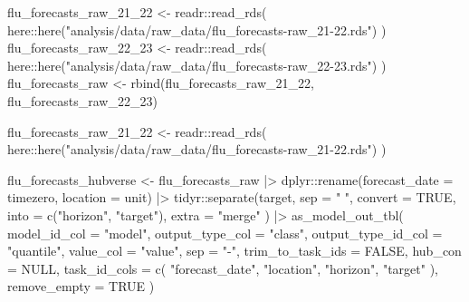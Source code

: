 \documentclass[
]{article}
\newenvironment{Shaded}{\begin{snugshade}}{\end{snugshade}}
\newcommand{\AttributeTok}[1]{\textcolor[rgb]{0.40,0.45,0.13}{#1}}
\newcommand{\ConstantTok}[1]{\textcolor[rgb]{0.56,0.35,0.01}{#1}}
\newcommand{\FunctionTok}[1]{\textcolor[rgb]{0.28,0.35,0.67}{#1}}
\newcommand{\NormalTok}[1]{\textcolor[rgb]{0.00,0.23,0.31}{#1}}
\newcommand{\OtherTok}[1]{\textcolor[rgb]{0.00,0.23,0.31}{#1}}
\newcommand{\SpecialCharTok}[1]{\textcolor[rgb]{0.37,0.37,0.37}{#1}}
\newcommand{\StringTok}[1]{\textcolor[rgb]{0.13,0.47,0.30}{#1}}
\begin{document}
\begin{Shaded}
\begin{Highlighting}[]
\NormalTok{flu\_forecasts\_raw\_21\_22 }\OtherTok{\textless{}{-}}\NormalTok{ readr}\SpecialCharTok{::}\FunctionTok{read\_rds}\NormalTok{(}
\NormalTok{  here}\SpecialCharTok{::}\FunctionTok{here}\NormalTok{(}\StringTok{"analysis/data/raw\_data/flu\_forecasts{-}raw\_21{-}22.rds"}\NormalTok{)}
\NormalTok{)}
\NormalTok{flu\_forecasts\_raw\_22\_23 }\OtherTok{\textless{}{-}}\NormalTok{ readr}\SpecialCharTok{::}\FunctionTok{read\_rds}\NormalTok{(}
\NormalTok{  here}\SpecialCharTok{::}\FunctionTok{here}\NormalTok{(}\StringTok{"analysis/data/raw\_data/flu\_forecasts{-}raw\_22{-}23.rds"}\NormalTok{)}
\NormalTok{)}
\NormalTok{flu\_forecasts\_raw }\OtherTok{\textless{}{-}} \FunctionTok{rbind}\NormalTok{(flu\_forecasts\_raw\_21\_22, flu\_forecasts\_raw\_22\_23)}

\NormalTok{flu\_forecasts\_raw\_21\_22 }\OtherTok{\textless{}{-}}\NormalTok{ readr}\SpecialCharTok{::}\FunctionTok{read\_rds}\NormalTok{(}
\NormalTok{  here}\SpecialCharTok{::}\FunctionTok{here}\NormalTok{(}\StringTok{"analysis/data/raw\_data/flu\_forecasts{-}raw\_21{-}22.rds"}\NormalTok{)}
\NormalTok{)}

\NormalTok{flu\_forecasts\_hubverse }\OtherTok{\textless{}{-}}\NormalTok{ flu\_forecasts\_raw }\SpecialCharTok{|\textgreater{}}
\NormalTok{  dplyr}\SpecialCharTok{::}\FunctionTok{rename}\NormalTok{(}\AttributeTok{forecast\_date =}\NormalTok{ timezero, }\AttributeTok{location =}\NormalTok{ unit) }\SpecialCharTok{|\textgreater{}}
\NormalTok{  tidyr}\SpecialCharTok{::}\FunctionTok{separate}\NormalTok{(target,}
    \AttributeTok{sep =} \StringTok{" "}\NormalTok{, }\AttributeTok{convert =} \ConstantTok{TRUE}\NormalTok{,}
    \AttributeTok{into =} \FunctionTok{c}\NormalTok{(}\StringTok{"horizon"}\NormalTok{, }\StringTok{"target"}\NormalTok{), }\AttributeTok{extra =} \StringTok{"merge"}
\NormalTok{  ) }\SpecialCharTok{|\textgreater{}}
  \FunctionTok{as\_model\_out\_tbl}\NormalTok{(}
    \AttributeTok{model\_id\_col =} \StringTok{"model"}\NormalTok{,}
    \AttributeTok{output\_type\_col =} \StringTok{"class"}\NormalTok{,}
    \AttributeTok{output\_type\_id\_col =} \StringTok{"quantile"}\NormalTok{,}
    \AttributeTok{value\_col =} \StringTok{"value"}\NormalTok{,}
    \AttributeTok{sep =} \StringTok{"{-}"}\NormalTok{,}
    \AttributeTok{trim\_to\_task\_ids =} \ConstantTok{FALSE}\NormalTok{,}
    \AttributeTok{hub\_con =} \ConstantTok{NULL}\NormalTok{,}
    \AttributeTok{task\_id\_cols =} \FunctionTok{c}\NormalTok{(}
      \StringTok{"forecast\_date"}\NormalTok{, }\StringTok{"location"}\NormalTok{, }\StringTok{"horizon"}\NormalTok{,}
      \StringTok{"target"}
\NormalTok{    ),}
    \AttributeTok{remove\_empty =} \ConstantTok{TRUE}
\NormalTok{  )}
\end{Highlighting}
\end{Shaded}
\end{document}
